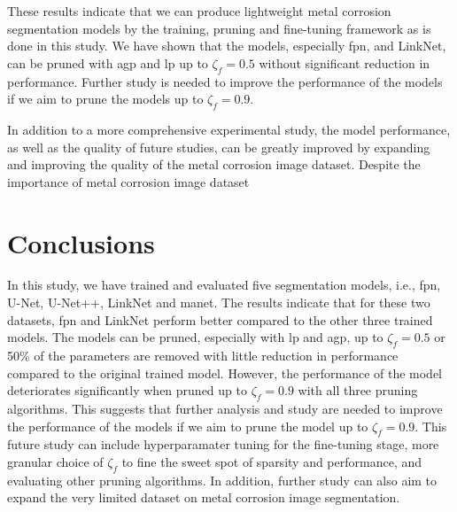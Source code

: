 \documentclass[mathematics,article,submit,pdftex,moreauthors]{Definitions/mdpi}
\begin{document}
These results indicate that we can produce lightweight
metal corrosion segmentation models by the training, 
pruning and fine-tuning framework as is done in this study.
We have shown that the models, especially \ac{fpn},
and LinkNet, can be pruned with \ac{agp}
and \ac{lp} up to $\zeta_f=0.5$ without
significant reduction in performance. Further study
is needed to improve the performance of the models
if we aim to prune the models up to $\zeta_f=0.9$. 

In addition to a more comprehensive experimental study,
the model performance, as well as the quality of future
studies, can be greatly improved by expanding and improving
the quality of the metal corrosion image dataset.
Despite the importance of metal corrosion image dataset


\section{Conclusions}
In this study, we have trained and evaluated five 
segmentation models, i.e., \ac{fpn}, U-Net, U-Net++, 
LinkNet and \ac{manet}. The results indicate that for 
these two datasets, \ac{fpn} and LinkNet perform better compared to 
the other three trained models.
The models can be pruned, especially with \ac{lp}
and \ac{agp}, up to $\zeta_f=0.5$ or 50\% of 
the parameters are removed with
little reduction in performance compared to
the original trained model. However,
the performance of the model deteriorates significantly
when pruned up to $\zeta_f=0.9$ with all three pruning
algorithms. This suggests that further analysis
and study are needed to improve the performance
of the models if we aim to prune the model up to $\zeta_f=0.9$.
This future study can include hyperparamater tuning
for the fine-tuning stage, more granular choice
of $\zeta_f$ to fine the sweet spot of sparsity
and performance, and evaluating other pruning algorithms.
In addition, further study can also aim to expand
the very limited dataset on 
metal corrosion image segmentation.


\end{document}
